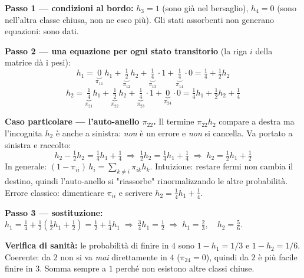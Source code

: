 \documentclass[12pt]{extarticle} %
\begin{document}
\textbf{Passo 1 --- condizioni al bordo:} $h_3 = 1$ (sono già nel bersaglio), $h_4 = 0$ (sono nell'altra classe chiusa, non ne esco più). Gli stati assorbenti non generano equazioni: sono dati.

\textbf{Passo 2 --- una equazione per ogni stato transitorio} (la riga $i$ della matrice dà i pesi):
$$ h_1 = \underbrace{0}_{\pi_{11}}\,h_1 + \underbrace{\tfrac12}_{\pi_{12}} h_2 + \underbrace{\tfrac14}_{\pi_{13}} \cdot 1 + \underbrace{\tfrac14}_{\pi_{14}} \cdot 0 = \tfrac14 + \tfrac12 h_2 $$
$$ h_2 = \underbrace{\tfrac14}_{\pi_{21}} h_1 + \underbrace{\tfrac12}_{\pi_{22}} h_2 + \underbrace{\tfrac14}_{\pi_{23}} \cdot 1 + \underbrace{0}_{\pi_{24}} \cdot 0 = \tfrac14 h_1 + \tfrac12 h_2 + \tfrac14 $$

\textbf{Caso particolare --- l'auto-anello $\pi_{22}$.} Il termine $\pi_{22} h_2$ compare a destra ma l'incognita $h_2$ è anche a sinistra: \emph{non} è un errore e \emph{non} si cancella. Va portato a sinistra e raccolto:
$$ h_2 - \tfrac12 h_2 = \tfrac14 h_1 + \tfrac14 \;\Longrightarrow\; \tfrac12 h_2 = \tfrac14 h_1 + \tfrac14 \;\Longrightarrow\; h_2 = \tfrac12 h_1 + \tfrac12 $$
{\footnotesize In generale: $(1-\pi_{ii})\,h_i = \sum_{k \neq i} \pi_{ik} h_k$. Intuizione: restare fermi non cambia il destino, quindi l'auto-anello si "riassorbe" rinormalizzando le altre probabilità. Errore classico: dimenticare $\pi_{ii}$ e scrivere $h_2 = \frac14 h_1 + \frac14$.}

\textbf{Passo 3 --- sostituzione:} $h_1 = \tfrac14 + \tfrac12\left(\tfrac12 h_1 + \tfrac12\right) = \tfrac12 + \tfrac14 h_1 \;\Rightarrow\; \tfrac34 h_1 = \tfrac12 \;\Rightarrow\; \boxed{h_1 = \tfrac23}, \quad h_2 = \tfrac56.$

\textbf{Verifica di sanità:} le probabilità di finire in $4$ sono $1-h_1 = 1/3$ e $1-h_2 = 1/6$. Coerente: da $2$ non si va \emph{mai} direttamente in $4$ ($\pi_{24}=0$), quindi da $2$ è più facile finire in $3$. Somma sempre a $1$ perché non esistono altre classi chiuse.
\end{document}
